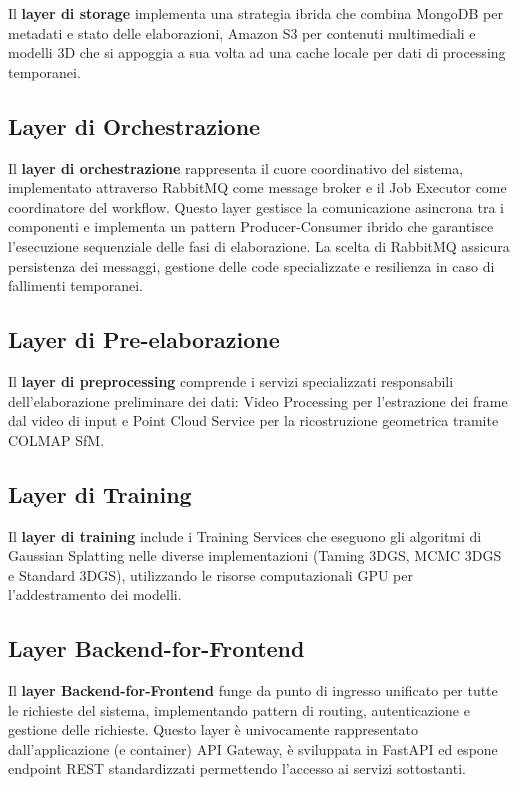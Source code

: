 Il \textbf{layer di storage} implementa una strategia ibrida che combina MongoDB per metadati e stato delle elaborazioni, Amazon S3 per contenuti multimediali e modelli 3D che si appoggia a sua volta ad una cache locale per dati di processing temporanei.

\subsection{Layer di Orchestrazione}

Il \textbf{layer di orchestrazione} rappresenta il cuore coordinativo del sistema, implementato attraverso RabbitMQ come message broker e il Job Executor come coordinatore del workflow. Questo layer gestisce la comunicazione asincrona tra i componenti e implementa un pattern Producer-Consumer ibrido che garantisce l'esecuzione sequenziale delle fasi di elaborazione. La scelta di RabbitMQ assicura persistenza dei messaggi, gestione delle code specializzate e resilienza in caso di fallimenti temporanei.

\subsection{Layer di Pre-elaborazione}
Il \textbf{layer di preprocessing} comprende i servizi specializzati responsabili dell'elaborazione preliminare dei dati: Video Processing per l'estrazione dei frame dal video di input e Point Cloud Service per la ricostruzione geometrica tramite COLMAP SfM.

\subsection{Layer di Training}
Il \textbf{layer di training} include i Training Services che eseguono gli algoritmi di Gaussian Splatting nelle diverse implementazioni (Taming 3DGS, MCMC 3DGS e Standard 3DGS), utilizzando le risorse computazionali GPU per l'addestramento dei modelli.

\subsection{Layer Backend-for-Frontend}
Il \textbf{layer Backend-for-Frontend} funge da punto di ingresso unificato per tutte le richieste del sistema, implementando pattern di routing, autenticazione e gestione delle richieste. Questo layer è univocamente rappresentato dall'applicazione (e container) API Gateway, è sviluppata in FastAPI ed espone endpoint REST standardizzati permettendo l'accesso ai servizi sottostanti.

